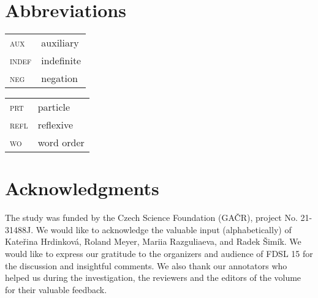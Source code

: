 \documentclass[output=paper,colorlinks,citecolor=brown]{langscibook}
\begin{document}

%


\section*{Abbreviations}

\begin{tabularx}{.5\textwidth}{@{}lQ}
\textsc{aux}&auxiliary\\
\textsc{indef}&indefinite\\
\textsc{neg}&negation\\
\end{tabularx}%
\begin{tabularx}{.5\textwidth}{lQ@{}}
\textsc{prt}&particle\\
\textsc{refl}&reflexive\\
\textsc{wo}&word order\\
\end{tabularx}

\section*{Acknowledgments}
The study was funded by the Czech Science Foundation (GA\v{C}R), project No. 21-31488J. We would like to acknowledge the valuable input (alphabetically) of Kateřina Hrdinková, Roland Meyer, Mariia Razguliaeva, and Radek Šimík. We would like to express our gratitude to the organizers and audience of FDSL 15 for the discussion and insightful comments. We also thank our annotators who helped us during the investigation, the reviewers and the editors of the volume for their valuable feedback. 

\printbibliography[heading=subbibliography,notkeyword=this]
\end{document}
